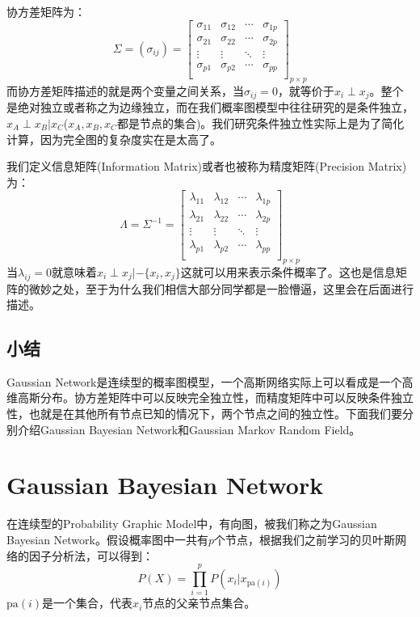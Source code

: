 \documentclass[a4paper]{article}
\begin{document}
协方差矩阵为：
\begin{equation}
    \Sigma = (\sigma_{ij}) = 
    \begin{bmatrix}
    \sigma_{11} & \sigma_{12} & \cdots &\sigma_{1p} \\
    \sigma_{21} & \sigma_{22} & \cdots &\sigma_{2p} \\
    \vdots & \vdots & \ddots & \vdots \\
    \sigma_{p1} & \sigma_{p2} & \cdots &\sigma_{pp} \\
    \end{bmatrix}_{p\times p}
\end{equation}
而协方差矩阵描述的就是两个变量之间关系，当$\sigma_{ij}=0$，就等价于$x_i \perp x_j$。整个是绝对独立或者称之为边缘独立，而在我们概率图模型中往往研究的是条件独立，$x_A \perp x_B | x_C$($x_A,x_B,x_C$都是节点的集合)。我们研究条件独立性实际上是为了简化计算，因为完全图的复杂度实在是太高了。

我们定义信息矩阵(Information Matrix)或者也被称为精度矩阵(Precision Matrix)为：
\begin{equation}
    \Lambda = \Sigma^{-1} = \begin{bmatrix}
    \lambda_{11} & \lambda_{12} & \cdots &\lambda_{1p} \\
    \lambda_{21} & \lambda_{22} & \cdots &\lambda_{2p} \\
    \vdots & \vdots & \ddots & \vdots \\
    \lambda_{p1} & \lambda_{p2} & \cdots &\lambda_{pp} \\
    \end{bmatrix}_{p\times p}
\end{equation}
当$\lambda_{ij}=0$就意味着$x_i\perp x_j |-\{x_i,x_j \}$这就可以用来表示条件概率了。这也是信息矩阵的微妙之处，至于为什么我们相信大部分同学都是一脸懵逼，这里会在后面进行描述。

\subsection{小结}
Gaussian Network是连续型的概率图模型，一个高斯网络实际上可以看成是一个高维高斯分布。协方差矩阵中可以反映完全独立性，而精度矩阵中可以反映条件独立性，也就是在其他所有节点已知的情况下，两个节点之间的独立性。下面我们要分别介绍Gaussian Bayesian Network和Gaussian Markov Random Field。

\section{Gaussian Bayesian Network}
在连续型的Probability Graphic Model中，有向图，被我们称之为Gaussian Bayesian Network。假设概率图中一共有$p$个节点，根据我们之前学习的贝叶斯网络的因子分析法，可以得到：
\begin{equation}
    P(X) = \prod_{i=1}^p P(x_i|x_{\mathrm{pa}(i)})
\end{equation}
$\mathrm{pa}(i)$是一个集合，代表$x_i$节点的父亲节点集合。
\end{document}
